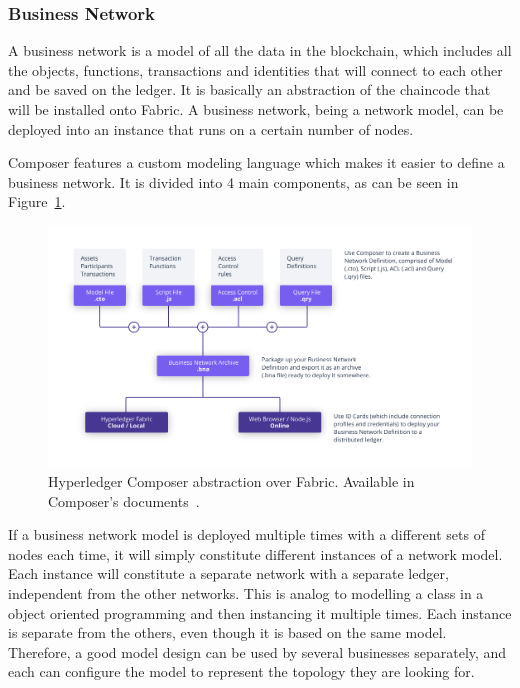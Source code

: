 \subsubsection{Business Network}

A business network is a model of all the data in the blockchain, which includes all the objects, functions, transactions and identities that will connect to each other and be saved on the ledger. It is basically an abstraction of the chaincode that will be installed onto Fabric. A business network, being a network model, can be deployed into an instance that runs on a certain number of nodes.

Composer features a custom modeling language which makes it easier to define a business network. It is divided into 4 main components, as can be seen in Figure~\ref{fig:composer_abstraction}.

\begin{figure}[h]
\centering
\includegraphics[scale=0.40]{media/Composer-Diagram.png}
\caption[Hyperledger Composer abstraction over Fabric]{Hyperledger Composer abstraction over Fabric. Available in Composer's documents~\cite{ComposerIntro}.}
\label{fig:composer_abstraction}
\end{figure}

If a business network model is deployed multiple times with a different sets of nodes each time, it will simply constitute different instances of a network model. Each instance will constitute a separate network with a separate ledger, independent from the other networks. This is analog to modelling a class in a object oriented programming and then instancing it multiple times. Each instance is separate from the others, even though it is based on the same model. Therefore, a good model design can be used by several businesses separately, and each can configure the model to represent the topology they are looking for.

